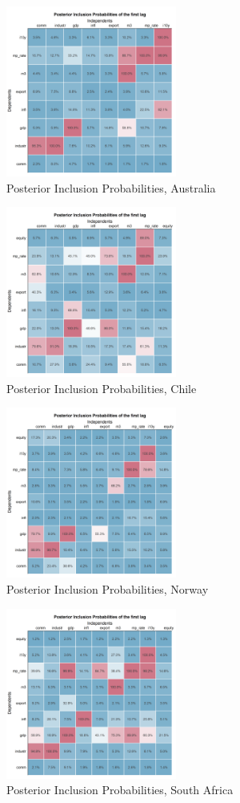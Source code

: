 \documentclass[12pt,]{article}
\begin{document}
\begin{figure}
\centering
\includegraphics[width=0.50000\textwidth]{img/pip_heatmap_AUS.png}
\caption{Posterior Inclusion Probabilities, Australia}
\end{figure}

\begin{figure}
\centering
\includegraphics[width=0.50000\textwidth]{img/pip_heatmap_CHL.png}
\caption{Posterior Inclusion Probabilities, Chile}
\end{figure}

\begin{figure}
\centering
\includegraphics[width=0.50000\textwidth]{img/pip_heatmap_NOR.png}
\caption{Posterior Inclusion Probabilities, Norway}
\end{figure}

\begin{figure}
\centering
\includegraphics[width=0.50000\textwidth]{img/pip_heatmap_ZAF.png}
\caption{Posterior Inclusion Probabilities, South Africa}
\end{figure}
\end{document}
